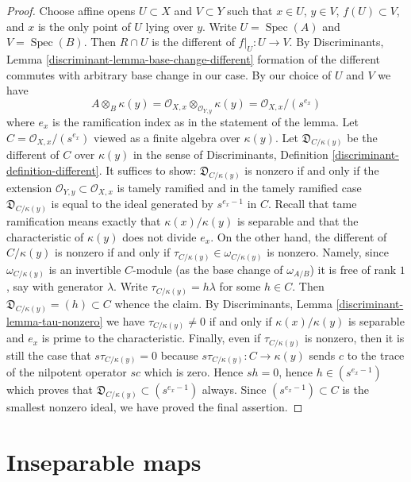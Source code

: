 \documentclass{stacks-project}
\theoremstyle{plain}
\theoremstyle{definition}
\theoremstyle{remark}
\numberwithin{equation}{subsection}
\def\Spec{\mathop{\mathrm{Spec}}}
\begin{document}
\begin{proof}
\medskip\noindent
Choose affine opens $U \subset X$ and $V \subset Y$
such that $x \in U$, $y \in V$, $f(U) \subset V$, and $x$ is the only
point of $U$ lying over $y$. Write $U = \Spec(A)$ and $V = \Spec(B)$.
Then $R \cap U$ is the different of $f|_U : U \to V$.
By Discriminants, Lemma \ref{discriminant-lemma-base-change-different}
formation of the different commutes with arbitrary base change
in our case. By our choice of $U$ and $V$ we have
$$
A \otimes_B \kappa(y) =
\mathcal{O}_{X, x} \otimes_{\mathcal{O}_{Y, y}} \kappa(y) =
\mathcal{O}_{X, x}/(s^{e_x})
$$
where $e_x$ is the ramification index as in the statement of the lemma.
Let $C = \mathcal{O}_{X, x}/(s^{e_x})$ viewed as a finite algebra
over $\kappa(y)$. Let $\mathfrak{D}_{C/\kappa(y)}$ be the different
of $C$ over $\kappa(y)$ in the sense of
Discriminants, Definition \ref{discriminant-definition-different}.
It suffices to show: $\mathfrak{D}_{C/\kappa(y)}$
is nonzero if and only if the extension
$\mathcal{O}_{Y, y} \subset \mathcal{O}_{X, x}$ is tamely ramified
and in the tamely ramified case $\mathfrak{D}_{C/\kappa(y)}$
is equal to the ideal generated by $s^{e_x - 1}$ in $C$.
Recall that tame ramification means exactly that $\kappa(x)/\kappa(y)$
is separable and that the characteristic of $\kappa(y)$ does not
divide $e_x$. On the other hand, the different of $C/\kappa(y)$ is nonzero
if and only if $\tau_{C/\kappa(y)} \in \omega_{C/\kappa(y)}$ is nonzero.
Namely, since $\omega_{C/\kappa(y)}$ is an invertible $C$-module
(as the base change of $\omega_{A/B}$)
it is free of rank $1$, say with generator $\lambda$. Write
$\tau_{C/\kappa(y)} = h\lambda$ for some $h \in C$. Then
$\mathfrak{D}_{C/\kappa(y)} = (h) \subset C$ whence the claim.
By Discriminants, Lemma \ref{discriminant-lemma-tau-nonzero}
we have $\tau_{C/\kappa(y)} \not = 0$
if and only if $\kappa(x)/\kappa(y)$
is separable and $e_x$ is prime to the characteristic.
Finally, even if $\tau_{C/\kappa(y)}$ is nonzero, then
it is still the case that $s \tau_{C/\kappa(y)} = 0$
because $s\tau_{C/\kappa(y)} : C \to \kappa(y)$
sends $c$ to the trace of the nilpotent operator $sc$ which is zero.
Hence $sh = 0$, hence $h \in (s^{e_x - 1})$ which proves
that $\mathfrak{D}_{C/\kappa(y)} \subset (s^{e_x - 1})$ always.
Since $(s^{e_x - 1}) \subset C$ is the smallest nonzero ideal,
we have proved the final assertion.
\end{proof}






\section{Inseparable maps}
\label{section-inseparable}
\end{document}
